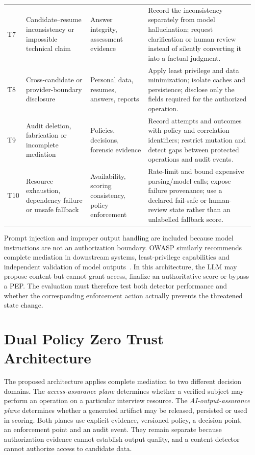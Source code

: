 \documentclass[conference]{IEEEtran}
\begin{document}
\begin{table}[t]
\begin{tabular}{@{}p{}p{}p{}p{}@{}}
T7 & Candidate--resume inconsistency or impossible technical claim & Answer integrity, assessment evidence & Record the inconsistency separately from model hallucination; request clarification or human review instead of silently converting it into a factual judgment. \\
T8 & Cross-candidate or provider-boundary disclosure & Personal data, resumes, answers, reports & Apply least privilege and data minimization; isolate caches and persistence; disclose only the fields required for the authorized operation. \\
T9 & Audit deletion, fabrication or incomplete mediation & Policies, decisions, forensic evidence & Record attempts and outcomes with policy and correlation identifiers; restrict mutation and detect gaps between protected operations and audit events. \\
T10 & Resource exhaustion, dependency failure or unsafe fallback & Availability, scoring consistency, policy enforcement & Rate-limit and bound expensive parsing/model calls; expose failure provenance; use a declared fail-safe or human-review state rather than an unlabelled fallback score. \\
\bottomrule
\end{tabular}
\end{table}

Prompt injection and improper output handling are included because model instructions are not an authorization boundary. OWASP similarly recommends complete mediation in downstream systems, least-privilege capabilities and independent validation of model outputs~\cite{owasp2025llm}. In this architecture, the LLM may propose content but cannot grant access, finalize an authoritative score or bypass a PEP. The evaluation must therefore test both detector performance and whether the corresponding enforcement action actually prevents the threatened state change.

\section{Dual Policy Zero Trust Architecture}

The proposed architecture applies complete mediation to two different decision domains. The \emph{access-assurance plane} determines whether a verified subject may perform an operation on a particular interview resource. The \emph{AI-output-assurance plane} determines whether a generated artifact may be released, persisted or used in scoring. Both planes use explicit evidence, versioned policy, a decision point, an enforcement point and an audit event. They remain separate because authorization evidence cannot establish output quality, and a content detector cannot authorize access to candidate data.
\end{document}
